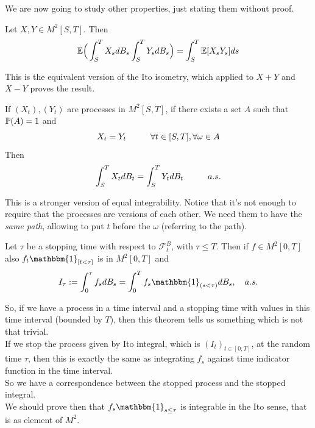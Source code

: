 We are now going to study other properties, just stating them without proof. \\
\begin{PropBox}
    \begin{Proposition}
    Let $X,Y \in M^2[S,T]$. Then 
    \begin{equation*}
        \mathbb{E}\Big(\int_S^T X_s dB_s\int_S^T Y_s dB_s \Big) = \int_S^T \mathbb{E}[X_s Y_s] ds
    \end{equation*}
\end{Proposition}
\end{PropBox}
This is the equivalent version of the Ito isometry, which applied to $X+Y$ and $X-Y$ proves the result. 
\begin{ThBox}
    \begin{Th}[Uniqueness]
    If $(X_t),(Y_t)$ are processes in $M^2[S,T]$, if there exists a set $A$ such that $\mathbb{P}(A)=1$ and 
    \begin{equation*}
        X_t = Y_t \hspace{1 cm} \forall t \in [S,T], \forall \omega \in A    
    \end{equation*}
    Then
    \begin{equation*}
        \int_S^T X_t dB_t= \int_S^T Y_t dB_t  \hspace{ 1 cm} a.s.
    \end{equation*}
\end{Th}
\end{ThBox}
This is a stronger version of equal integrability. Notice that it's not enough to require that the processes are versions of each other. We need them to have the \emph{same path}, allowing to put $t$ before the $\omega$ (referring to the path).
\begin{ThBox}
    \begin{Th}
    Let $\tau$ be a stopping time with respect to $\mathcal{F}_t ^B$, with $\tau \leq T$. Then if $f \in M^2[0,T]$ also $f_t \mathbbm{1}_{[t < \tau]}$ is in $M^2[0,T]$  and 
    \begin{align*}
        I_\tau:= \int _0^\tau f_s dB_s = \int _0^T f_s \mathbbm{1}_{(s <\tau)} dB_s, \quad a.s.
    \end{align*}
    \end{Th}
\end{ThBox}
So, if we have a process in a time interval and a stopping time with values in this time interval (bounded by $T$), then this theorem tells us something which is not that trivial. \\
If we stop the process given by Ito integral, which is $(I_t)_{t \in [0,T]}$, at the random time $\tau$, then this is exactly the same as integrating $f_s$ against time indicator function in the time interval. \\
So we have a correspondence between the stopped process and the stopped integral. \\
We should prove then that $f_s \mathbbm{1}_{s \leq \tau}$ is integrable in the Ito sense, that is as element of $M^2$. \\ 

